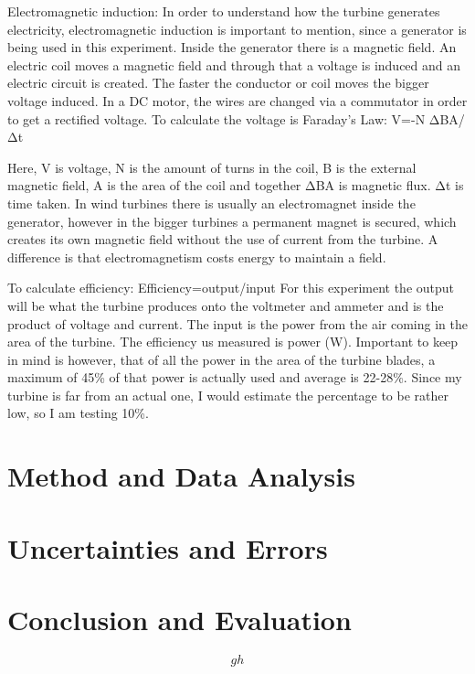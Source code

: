 \documentclass[12pt]{article}
\begin{document}
 
Electromagnetic induction:
In order to understand how the turbine generates electricity, electromagnetic induction is important to mention, since a generator is being used in this experiment. Inside the generator there is a magnetic field. An electric coil moves a magnetic field and through that a voltage is induced and an electric circuit is created. The faster the conductor or coil moves the bigger voltage induced. In a DC motor, the wires are changed via a commutator in order to get a rectified voltage.
To calculate the voltage is Faraday’s Law:
V=-N ΔBA/Δt

Here, V is voltage, N is the amount of turns in the coil, B is the external magnetic field, A is the area of the coil and together ΔBA is magnetic flux. Δt is time taken.
In wind turbines there is usually an electromagnet inside the generator, however in the bigger turbines a permanent magnet is secured, which creates its own magnetic field without the use of current from the turbine. A difference is that electromagnetism costs energy to maintain a field. 

To calculate efficiency:
Efficiency=output/input
For this experiment the output will be what the turbine produces onto the voltmeter and ammeter and is the product of voltage and current. The input is the power from the air coming in the area of the turbine. The efficiency us measured is power (W). 
Important to keep in mind is however, that of all the power in the area of the turbine blades, a maximum of 45\% of that power is actually used and average is 22-28\%. Since my turbine is far from an actual one, I would estimate the percentage to be rather low, so I am testing 10\%. 


\section{Method and Data Analysis}


\section{Uncertainties and Errors}


\section{Conclusion and Evaluation}


\begin{equation}
  gh
\label{WRITE A UNIQUE NAME HERE}
\end{equation} 
\end{document}
